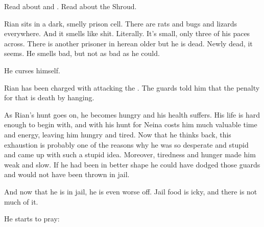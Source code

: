 
Read about  and . 
Read about the Shroud. 

\begin{comment}
  \section{Rian feels sorry for himself}
\end{comment}
Rian sits in a dark, smelly prison cell. 
There are rats and bugs and lizards everywhere.
And it smells like shit. 
Literally. 
It's small, only three of his paces across. 
There is another prisoner in here\dash an older \dax\dash but he is dead. 
Newly dead, it seems. 
He smells bad, but not as bad as he could. 

He curses himself. 


Rian has been charged with attacking the \rinyuth.
The guards told him that the penalty for that is death by hanging. 


As Rian's hunt goes on, he becomes hungry and his health suffers.
His life is hard enough to begin with, and with his hunt for Neina costs him much valuable time and energy, leaving him hungry and tired. 
Now that he thinks back, this exhaustion is probably one of the reasons why he was so desperate and stupid and came up with such a stupid idea. 
Moreover, tiredness and hunger made him weak and slow.
If he had been in better shape he could have dodged those guards and would not have been thrown in jail.

And now that he is in jail, he is even worse off. 
Jail food is icky, and there is not much of it.

He starts to pray:

